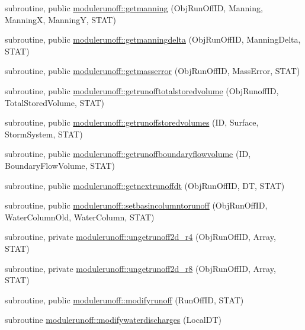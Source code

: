 \begin{DoxyCompactItemize}
\item 
subroutine, public \mbox{\hyperlink{namespacemodulerunoff_a2cad42fe7c6c24a46f9a75f3528e8abb}{modulerunoff\+::getmanning}} (Obj\+Run\+Off\+ID, Manning, ManningX, ManningY, S\+T\+AT)
\item 
subroutine, public \mbox{\hyperlink{namespacemodulerunoff_a9ca63f5612ab734b77497c2eca2c05bd}{modulerunoff\+::getmanningdelta}} (Obj\+Run\+Off\+ID, Manning\+Delta, S\+T\+AT)
\item 
subroutine, public \mbox{\hyperlink{namespacemodulerunoff_a9dff5ff4c2ef0ce7078dd08d46ddeb4b}{modulerunoff\+::getmasserror}} (Obj\+Run\+Off\+ID, Mass\+Error, S\+T\+AT)
\item 
subroutine, public \mbox{\hyperlink{namespacemodulerunoff_aa890e5ad105516c116e7c4f53b656bfb}{modulerunoff\+::getrunofftotalstoredvolume}} (Obj\+Runoff\+ID, Total\+Stored\+Volume, S\+T\+AT)
\item 
subroutine, public \mbox{\hyperlink{namespacemodulerunoff_a9d8c0b3cb553adb36c76cde2d6bcaef7}{modulerunoff\+::getrunoffstoredvolumes}} (ID, Surface, Storm\+System, S\+T\+AT)
\item 
subroutine, public \mbox{\hyperlink{namespacemodulerunoff_a3a9224ad169d37f7fdb8eb535513d1b1}{modulerunoff\+::getrunoffboundaryflowvolume}} (ID, Boundary\+Flow\+Volume, S\+T\+AT)
\item 
subroutine, public \mbox{\hyperlink{namespacemodulerunoff_a364cfd3bda8ba61cda13d20f848f20dc}{modulerunoff\+::getnextrunoffdt}} (Obj\+Run\+Off\+ID, DT, S\+T\+AT)
\item 
subroutine, public \mbox{\hyperlink{namespacemodulerunoff_a1bdc99360bd152034690c7eed836b2cf}{modulerunoff\+::setbasincolumntorunoff}} (Obj\+Run\+Off\+ID, Water\+Column\+Old, Water\+Column, S\+T\+AT)
\item 
subroutine, private \mbox{\hyperlink{namespacemodulerunoff_acd023a67da604bbfb903587e80244138}{modulerunoff\+::ungetrunoff2d\+\_\+r4}} (Obj\+Run\+Off\+ID, Array, S\+T\+AT)
\item 
subroutine, private \mbox{\hyperlink{namespacemodulerunoff_af00779fc9a81a3cdf2947f1c7990d1c8}{modulerunoff\+::ungetrunoff2d\+\_\+r8}} (Obj\+Run\+Off\+ID, Array, S\+T\+AT)
\item 
subroutine, public \mbox{\hyperlink{namespacemodulerunoff_a43ce9e041625ab643d74cc279ddf43db}{modulerunoff\+::modifyrunoff}} (Run\+Off\+ID, S\+T\+AT)
\item 
subroutine \mbox{\hyperlink{namespacemodulerunoff_aadda9f593eae7a9fbebc7ae31f4e847b}{modulerunoff\+::modifywaterdischarges}} (Local\+DT)

\end{DoxyCompactItemize}
